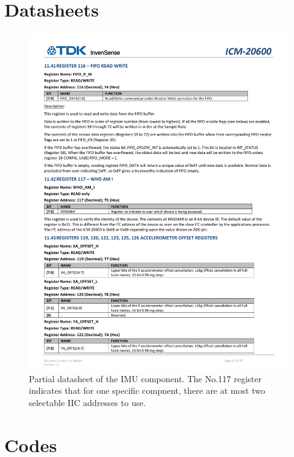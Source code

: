 \documentclass[12pt, a4paper]{report}
\begin{document}
\chapter{Datasheets}
\begin{figure}[htbp]
	\centering
	\includegraphics[width=1.1\textwidth]{
		fileForWriting/only two modifiable IIC address}
	\caption[Datasheet of the IMU component]{Partial datasheet of the IMU component. The No.117 register indicates that for one specific compnent, there are at most two selectable IIC addresses to use.}
	\label{fig:limited-IIC-address}
\end{figure}
\chapter{Codes}







\end{document}

